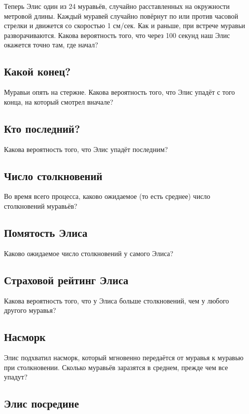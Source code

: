Теперь Элис один из 24 муравьёв, случайно расставленных на окружности метровой длины.
Каждый муравей случайно повёрнут по или против часовой стрелки и движется со скоростью 1 см/сек.
Как и раньше, при встрече муравьи разворачиваются.
Какова вероятность того, что через 100 секунд наш Элис окажется точно там, где начал?

\subsection*{Какой конец?}

Муравьи опять на стержне.
Какова вероятность того, что Элис упадёт с того конца, на который смотрел вначале?

\subsection*{Кто последний?}

Какова вероятность того, что Элис упадёт последним?

\subsection*{Число столкновений}

Во время всего процесса, каково ожидаемое (то есть среднее) число столкновений муравьёв?

\subsection*{Помятость Элиса}

Каково ожидаемое число столкновений у самого Элиса?

\subsection*{Страховой рейтинг Элиса}

Какова вероятность того, что у Элиса больше столкновений, чем у любого другого муравья?

\subsection*{Насморк}

Элис подхватил насморк, который мгновенно передаётся от муравья к муравью при столкновении.
Сколько муравьёв заразятся в среднем, прежде чем все упадут?

\subsection*{Элис посредине}

